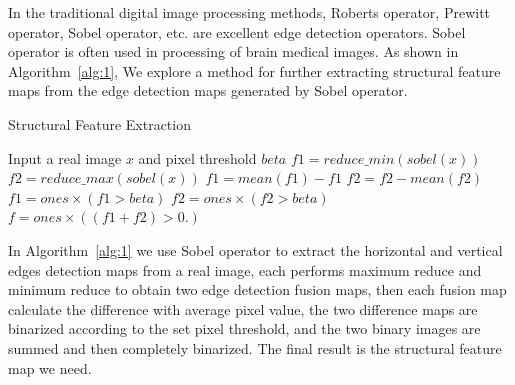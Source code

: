 \documentclass[letterpaper]{article} %
\begin{document}
In the traditional digital image processing methods, Roberts operator, Prewitt operator, Sobel operator, etc. are excellent edge detection operators. Sobel operator is often used in processing of brain medical images. As shown in Algorithm~\ref{alg:1}, We explore a method for further extracting structural feature maps from the edge detection maps generated by Sobel operator.
\begin{algorithm}
	\caption{Structural Feature Extraction}
	\label{alg:1}
	\begin{algorithmic}[1]
		\State Input a real image $x$ and pixel threshold $beta$
		\State $f1 = reduce\_min(sobel(x))$
		\State $f2 = reduce\_max(sobel(x))$
		\State $f1 = mean(f1) - f1$
		\State $f2 = f2 - mean(f2)$
		\State $f1 = ones \times (f1 > beta)$
		\State $f2 = ones \times (f2 > beta)$
		\State $f = ones \times ((f1 + f2)> 0.)$
	\end{algorithmic}  
\end{algorithm}

In Algorithm~\ref{alg:1} we use Sobel operator to extract the horizontal and vertical edges detection maps from a real image, each performs maximum  reduce and minimum reduce to obtain two edge detection fusion maps, then each fusion map calculate the difference with average pixel value, the two difference maps are binarized according to the set pixel threshold, and the two binary images are summed and then completely binarized. The final result is the structural feature map we need.
\end{document}
